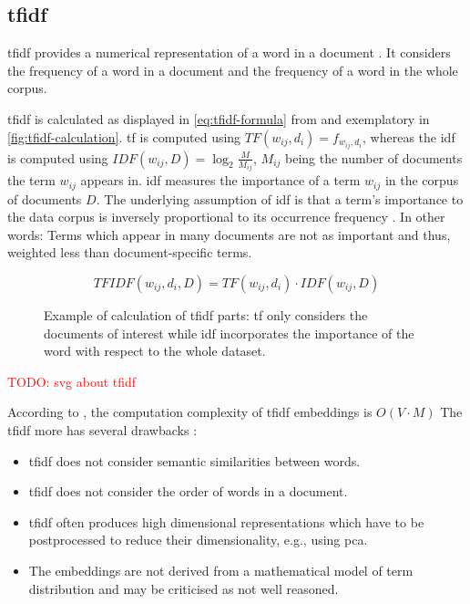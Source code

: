 \subsection{\ac{tfidf}}\label{subsec:tfidf}

\ac{tfidf} provides a numerical representation of a word in a document \cite{clusteringDocs2020}.
It considers the frequency of a word in a document and the frequency of a word in the whole corpus. 

\ac{tfidf} is calculated as displayed in \autoref{eq:tfidf-formula} from \cite{clusteringDocs2020} and exemplatory in \autoref{fig:tfidf-calculation}.
\ac{tf} is computed using $TF(w_{ij}, d_i) = f_{w_{ij}, d_i}$, whereas the \ac{idf} is computed using $IDF(w_{ij}, D) = \log_2\frac{M}{M_{ij}}$, 
$M_{ij}$ being the number of documents the term $w_{ij}$ appears in.
\ac{idf} measures the importance of a term $w_{ij}$ in the corpus of documents $D$.
The underlying assumption of \ac{idf} is that a term's importance to the data corpus is inversely proportional to its occurrence frequency \cite{tfidf2008}.
In other words: Terms which appear in many documents are not as important and thus, weighted less than document-specific terms. 

\begin{equation}
    TFIDF(w_{ij}, d_i, D) = TF(w_{ij}, d_i) \cdot IDF(w_{ij}, D)
    \label{eq:tfidf-formula}
\end{equation}


\begin{figure}[htp] %
    \centering
    
    \caption{
        Example of calculation of \ac{tfidf} parts: 
        \ac{tf} only considers the documents of interest while 
        \ac{idf} incorporates the importance of the word with respect to the whole dataset.
    }
    \label{fig:tfidf-calculation}
\end{figure}

\textcolor{red}{TODO: svg about tfidf}

According to \citeauthor{tfidf2008}, the computation complexity of \ac{tfidf} embeddings is $O(V \cdot M)$
The \ac{tfidf} more has several drawbacks \cite{clusteringDocs2020,tfidf2008}:
\begin{itemize}
    \item \ac{tfidf} does not consider semantic similarities between words.
    \item \ac{tfidf} does not consider the order of words in a document.
    \item \ac{tfidf} often produces high dimensional representations which have to be postprocessed to reduce their dimensionality, e.g., using \ac{pca}.
    \item The embeddings are not derived from a mathematical model of term distribution and may be criticised as not well reasoned.
\end{itemize}